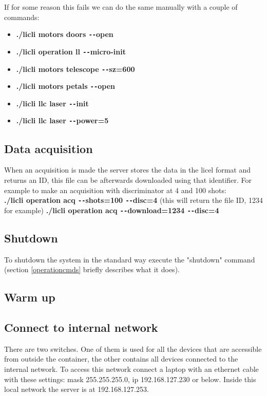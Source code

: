 \documentclass[letterpaper, 10 pt]{article}
\begin{document}
If for some reason this fails we can do the same manually with a couple of commands:
\begin{itemize}
	\item \textbf{./licli motors doors \texttt{-{}-}open}
	\item \textbf{./licli operation ll  \texttt{-{}-}micro-init}
	\item \textbf{./licli motors telescope \texttt{-{}-}sz=600}
	\item \textbf{./licli motors petals \texttt{-{}-}open}
	\item \textbf{./licli llc laser \texttt{-{}-}init}
	\item  \textbf{./licli llc laser \texttt{-{}-}power=5}
\end{itemize}
\subsection{Data acquisition}
When an acquisition is made the server stores the data in the licel format and returns an ID, this file can be afterwards downloaded using that identifier. For example to make an acquisition with discriminator at 4 and 100 shots:\\
\textbf{./licli operation acq \texttt{-{}-}shots=100 \texttt{-{}-}disc=4}  (this will return the file ID, 1234 for example)
\textbf{./licli operation acq \texttt{-{}-}download=1234 \texttt{-{}-}disc=4}
\subsection{Shutdown}
To shutdown the system in the standard way execute the "shutdown" command (section \ref{operationcmds} briefly describes what it does). \\

\subsection{Warm up}

\subsection{Connect to internal network}
There are two switches. One of them is used for all the devices that are accessible from outside the container, the other contains all devices connected to the internal network. To access this network connect a laptop with an ethernet cable with these settings: mask 255.255.255.0, ip 192.168.127.230 or below. Inside this local network the server is at 192.168.127.253.
\end{document}
